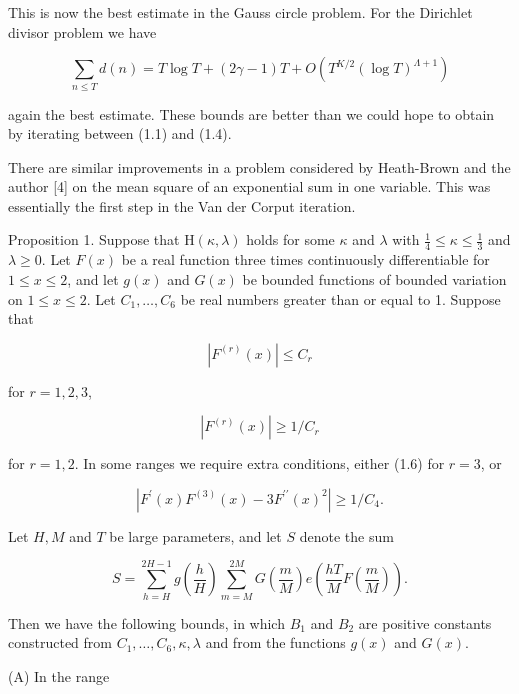 \documentclass[10pt]{article}
\begin{document}
This is now the best estimate in the Gauss circle problem. For the Dirichlet divisor problem we have

$$
\sum_{n \leqslant T} d(n)=T \log T+(2 \gamma-1) T+O\left(T^{K / 2}(\log T)^{\Lambda+1}\right)
$$

again the best estimate. These bounds are better than we could hope to obtain by iterating between (1.1) and (1.4).

There are similar improvements in a problem considered by Heath-Brown and the author [4] on the mean square of an exponential sum in one variable. This was essentially the first step in the Van der Corput iteration.

Proposition 1. Suppose that $\mathrm{H}(\kappa, \lambda)$ holds for some $\kappa$ and $\lambda$ with $\frac{1}{4} \leqslant \kappa \leqslant \frac{1}{3}$ and $\lambda \geqslant 0$. Let $F(x)$ be a real function three times continuously differentiable for $1 \leqslant x \leqslant 2$, and let $g(x)$ and $G(x)$ be bounded functions of bounded variation on $1 \leqslant x \leqslant 2$. Let $C_{1}, \ldots, C_{6}$ be real numbers greater than or equal to 1. Suppose that


\begin{equation*}
\left|F^{(r)}(x)\right| \leqslant C_{r} \tag{1.5}
\end{equation*}


for $r=1,2,3$,


\begin{equation*}
\left|F^{(r)}(x)\right| \geqslant 1 / C_{r} \tag{1.6}
\end{equation*}


for $r=1,2$. In some ranges we require extra conditions, either (1.6) for $r=3$, or


\begin{equation*}
\left|F^{\prime}(x) F^{(3)}(x)-3 F^{\prime \prime}(x)^{2}\right| \geqslant 1 / C_{4}. \tag{1.7}
\end{equation*}


Let $H, M$ and $T$ be large parameters, and let $S$ denote the sum

$$
S=\sum_{h=H}^{2 H-1} g\left(\frac{h}{H}\right) \sum_{m=M}^{2 M} G\left(\frac{m}{M}\right) e\left(\frac{h T}{M} F\left(\frac{m}{M}\right)\right).
$$

Then we have the following bounds, in which $B_{1}$ and $B_{2}$ are positive constants constructed from $C_{1}, \ldots, C_{6}, \kappa, \lambda$ and from the functions $g(x)$ and $G(x)$.

(A) In the range
\end{document}
